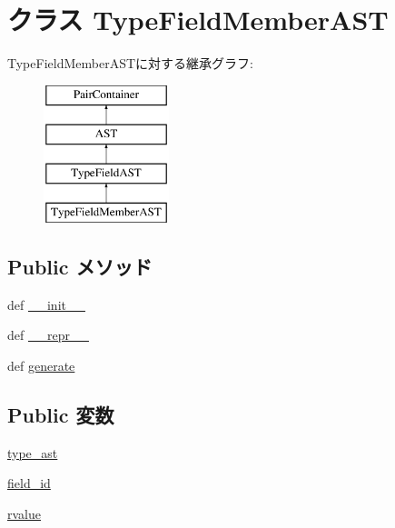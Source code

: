 \hypertarget{classslicc_1_1ast_1_1TypeFieldMemberAST_1_1TypeFieldMemberAST}{
\section{クラス TypeFieldMemberAST}
\label{classslicc_1_1ast_1_1TypeFieldMemberAST_1_1TypeFieldMemberAST}
}
TypeFieldMemberASTに対する継承グラフ:\begin{figure}[H]
\begin{center}
\leavevmode
\includegraphics[height=4cm]{classslicc_1_1ast_1_1TypeFieldMemberAST_1_1TypeFieldMemberAST}
\end{center}
\end{figure}
\subsection*{Public メソッド}
\begin{DoxyCompactItemize}
\item 
def \hyperlink{classslicc_1_1ast_1_1TypeFieldMemberAST_1_1TypeFieldMemberAST_ac775ee34451fdfa742b318538164070e}{\_\-\_\-init\_\-\_\-}
\item 
def \hyperlink{classslicc_1_1ast_1_1TypeFieldMemberAST_1_1TypeFieldMemberAST_ad8b9328939df072e4740cd9a63189744}{\_\-\_\-repr\_\-\_\-}
\item 
def \hyperlink{classslicc_1_1ast_1_1TypeFieldMemberAST_1_1TypeFieldMemberAST_a4555d1cee0dccf3942ea35fe86de2e8e}{generate}
\end{DoxyCompactItemize}
\subsection*{Public 変数}
\begin{DoxyCompactItemize}
\item 
\hyperlink{classslicc_1_1ast_1_1TypeFieldMemberAST_1_1TypeFieldMemberAST_a2c41e611550596541faa6f64ffecc139}{type\_\-ast}
\item 
\hyperlink{classslicc_1_1ast_1_1TypeFieldMemberAST_1_1TypeFieldMemberAST_a34ced61a2f2477f2d7a1279dac84ae9b}{field\_\-id}
\item 
\hyperlink{classslicc_1_1ast_1_1TypeFieldMemberAST_1_1TypeFieldMemberAST_a40a265204241bcb473955e194173909e}{rvalue}
\end{DoxyCompactItemize}


